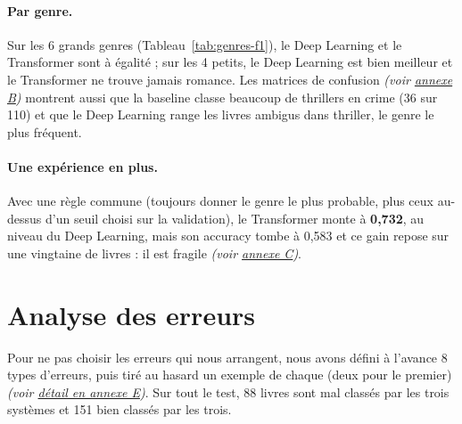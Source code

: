 \documentclass[11pt,a4paper]{article}
\newcommand{\voir}[2]{{\small\textit{(voir \hyperref[#1]{#2})}}}
\begin{document}
\paragraph{Par genre.} Sur les 6 grands genres (Tableau~\ref{tab:genres-f1}), le Deep Learning et le Transformer sont à égalité ; sur les 4 petits, le Deep Learning est bien meilleur et le Transformer ne trouve jamais romance. Les matrices de confusion \voir{fig:confusion}{annexe B} montrent aussi que la baseline classe beaucoup de thrillers en crime (36 sur 110) et que le Deep Learning range les livres ambigus dans thriller, le genre le plus fréquent.

\paragraph{Une expérience en plus.} Avec une règle commune (toujours donner le genre le plus probable, plus ceux au-dessus d'un seuil choisi sur la validation), le Transformer monte à \textbf{0,732}, au niveau du Deep Learning, mais son accuracy tombe à 0,583 et ce gain repose sur une vingtaine de livres : il est fragile \voir{annexe:regle}{annexe C}.

\section{Analyse des erreurs}
Pour ne pas choisir les erreurs qui nous arrangent, nous avons défini à l'avance 8 types d'erreurs, puis tiré au hasard un exemple de chaque (deux pour le premier) \voir{annexe:erreurs}{détail en annexe E}. Sur tout le test, 88 livres sont mal classés par les trois systèmes et 151 bien classés par les trois.
\end{document}
